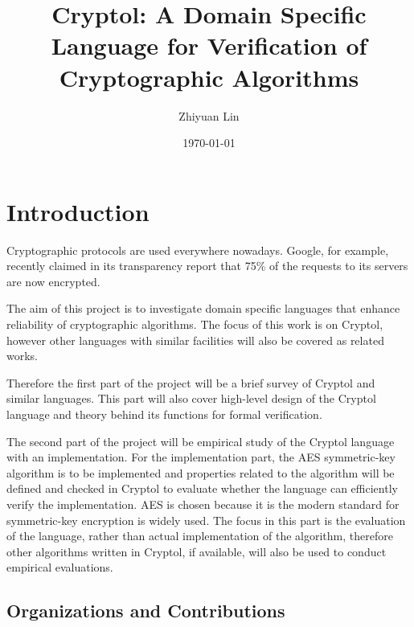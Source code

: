 \documentclass[a4paper, notitlepage]{report}
\title{Cryptol: A Domain Specific Language for  Verification of Cryptographic Algorithms}
\author{Zhiyuan Lin}
\date{\today}
\begin{document}
\maketitle
\begin{abstract}

\end{abstract}

\newpage

\tableofcontents

\newpage


\chapter{Introduction}

Cryptographic protocols are used everywhere nowadays. Google, for example,
recently claimed in its transparency report that 75\% of the requests to
its servers are now encrypted.


The aim of this project is to investigate domain specific languages
that enhance reliability of cryptographic algorithms. The focus of this
work is on Cryptol, however other languages with similar facilities will
also be covered as related works.

Therefore the first part of the project will be a brief survey of Cryptol
and similar languages. This part will also cover high-level design of
the Cryptol language and theory behind its functions for formal verification.

The second part of the project will be empirical study of the Cryptol language
with an implementation.
For the implementation part, the AES symmetric-key algorithm
\cite{standard2001announcing, bertoni2002efficient} is to be implemented
 and properties related to the algorithm will be defined and checked
in Cryptol to evaluate whether the language can efficiently verify
the implementation. AES is chosen because it is the modern standard
for symmetric-key encryption is widely used. 
The focus in this part is the evaluation of the language,
rather than actual implementation of the algorithm, therefore other
algorithms written in Cryptol, if available, will
also be used to conduct empirical evaluations.

\section{Organizations and Contributions}
\end{document}
